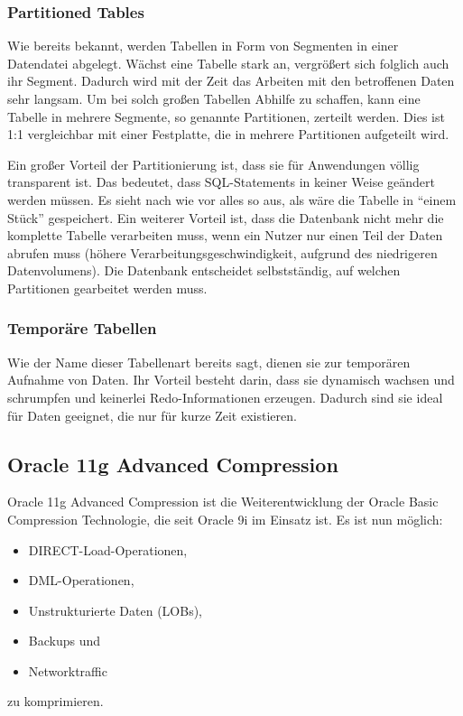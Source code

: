         \subsubsection{Partitioned Tables}
          Wie bereits bekannt, werden Tabellen in Form von Segmenten in einer
          Datendatei abgelegt. Wächst eine Tabelle stark an, vergrößert
          sich folglich auch ihr Segment. Dadurch wird mit der Zeit das Arbeiten
          mit den betroffenen Daten sehr langsam. Um bei solch großen
          Tabellen Abhilfe zu schaffen, kann eine Tabelle in mehrere Segmente,
          so genannte Partitionen, zerteilt werden. Dies ist 1:1 vergleichbar
          mit einer Festplatte, die in mehrere Partitionen aufgeteilt wird.

          Ein großer Vorteil der Partitionierung ist, dass sie für
          Anwendungen völlig transparent ist. Das bedeutet, dass
          SQL-Statements in keiner Weise geändert werden müssen. Es sieht
          nach wie vor alles so aus, als wäre die Tabelle in \enquote{einem
          Stück} gespeichert. Ein weiterer Vorteil ist, dass die Datenbank
          nicht mehr die komplette Tabelle verarbeiten muss, wenn ein Nutzer nur
          einen Teil der Daten abrufen muss (höhere
          Verarbeitungsgeschwindigkeit, aufgrund des niedrigeren Datenvolumens).
          Die Datenbank entscheidet selbstständig, auf welchen Partitionen
          gearbeitet werden muss.
        \subsubsection{Temporäre Tabellen}
          Wie der Name dieser Tabellenart bereits sagt, dienen sie zur temporären Aufnahme von Daten. Ihr Vorteil besteht darin, dass sie dynamisch wachsen und schrumpfen und keinerlei Redo-Informationen erzeugen. Dadurch sind sie ideal für Daten geeignet, die nur für kurze Zeit existieren.
      \subsection{Oracle 11g Advanced Compression}
        Oracle 11g Advanced Compression ist die Weiterentwicklung der Oracle Basic Compression Technologie, die seit Oracle 9i im Einsatz ist. Es ist nun möglich:
        \begin{itemize}
          \item DIRECT-Load-Operationen,
          \item DML-Operationen,
          \item Unstrukturierte Daten (LOBs),
          \item Backups und
          \item Networktraffic
        \end{itemize}
        zu komprimieren.

